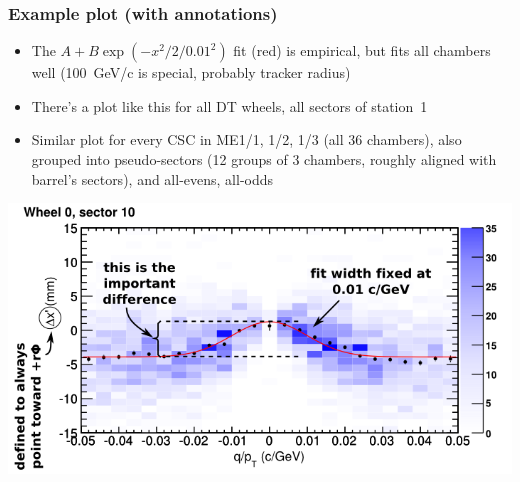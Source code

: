 \documentclass[compress]{beamer}
\begin{document}

\begin{frame}
\frametitle{Example plot (with annotations)}
\begin{itemize}
\item The $A + B \exp(-x^2/2/0.01^2)$ fit (red) is empirical, but fits all chambers well (100~GeV/c is special, probably tracker radius)
\item There's a plot like this for all DT wheels, all sectors of station~1
\item Similar plot for every CSC in ME1/1, 1/2, 1/3 (all 36 chambers),
  also grouped into pseudo-sectors (12 groups of 3 chambers, roughly
  aligned with barrel's sectors), and all-evens, all-odds
\end{itemize}

\vfill
\includegraphics[width=0.8\linewidth]{example.png}
\end{frame}
\end{document}
